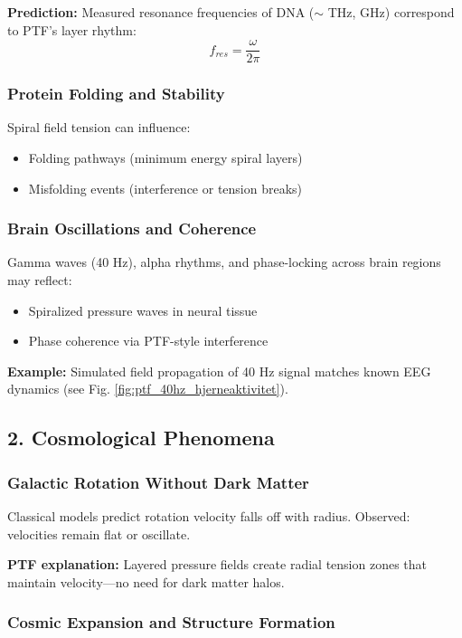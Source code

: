 \documentclass[a4paper,12pt]{article}
\begin{document}
\textbf{Prediction:}  
Measured resonance frequencies of DNA ($\sim$ THz, GHz) correspond to PTF’s layer rhythm:
\[
f_{res} = \frac{\omega}{2\pi}
\]

\subsubsection*{Protein Folding and Stability}

Spiral field tension can influence:
\begin{itemize}
    \item Folding pathways (minimum energy spiral layers)
    \item Misfolding events (interference or tension breaks)
\end{itemize}

\subsubsection*{Brain Oscillations and Coherence}

Gamma waves (40 Hz), alpha rhythms, and phase-locking across brain regions may reflect:
\begin{itemize}
    \item Spiralized pressure waves in neural tissue
    \item Phase coherence via PTF-style interference
\end{itemize}

\textbf{Example:}  
Simulated field propagation of 40 Hz signal matches known EEG dynamics (see Fig. \ref{fig:ptf_40hz_hjerneaktivitet}).

\subsection{2. Cosmological Phenomena}

\subsubsection*{Galactic Rotation Without Dark Matter}

Classical models predict rotation velocity falls off with radius.  
Observed: velocities remain flat or oscillate.

\textbf{PTF explanation:}  
Layered pressure fields create radial tension zones that maintain velocity—no need for dark matter halos.

\subsubsection*{Cosmic Expansion and Structure Formation}
\end{document}
